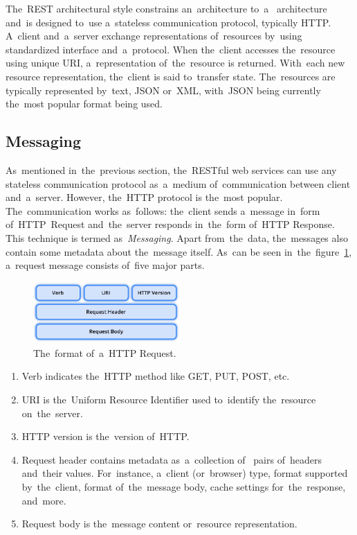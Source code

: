 The~REST architectural style constrains an~architecture to~a~
architecture and~is designed to~use a~stateless communication protocol,
typically HTTP. A~client and~a~server exchange representations of~resources
by~using standardized interface and~a~protocol. When the~client accesses
the~resource using unique URI, a~representation of~the~resource is returned.
With~each new resource representation, the~client is said to~transfer state.
The~resources are typically represented by~text, JSON or~XML, with~JSON being
currently the~most popular format being used.



\subsection{Messaging}
As~mentioned in~the~previous section, the~RESTful web services can use any stateless
communication protocol as~a~medium of~communication between client and~a~server.
However, the~HTTP protocol is the~most popular. The~communication works
as~follows: the~client sends a~message in~form of~HTTP~Request and~the~server
responds in~the~form of~HTTP Response. This technique is termed
as~\textit{Messaging}. Apart from~the~data, the~messages also contain some
metadata about the~message itself. As~can be seen
in~the~figure~\ref{fig-HTTPRequest}, a~request message consists of~five major
parts.

\begin{figure}[!hbt]
	\centering
	\includegraphics[width=0.5\textwidth]{./figures/http-request.pdf}
	\caption{The~format of~a~HTTP Request.}
	\label{fig-HTTPRequest}
\end{figure}

\begin{enumerate}
  \item Verb indicates the~HTTP method like GET, PUT, POST, etc.
  \item URI is the~Uniform Resource Identifier used to~identify the~resource
  on~the~server.
  \item HTTP version is the~version of~HTTP.
  \item Request header contains metadata as~a~collection of~ pairs
  of~headers and~their values. For~instance, a~client (or~browser) type, format
  supported by~the~client, format of~the~message body, cache settings
  for~the~response, and~more.
  \item Request body is the~message content or~resource representation.
\end{enumerate}

